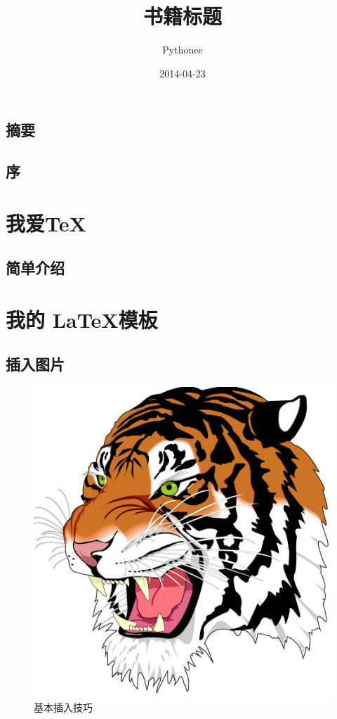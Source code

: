 \documentclass[fancyhdr,adobefonts,oneside,hyperref,openany,a4paper,UTF8]{ctexbook}
\author{Pythonee}
\title{书籍标题}
\date{2014-04-23}
\begin{document}
\maketitle


\frontmatter
\tableofcontents
\listoftables
\listoffigures
\lstlistoflistings
\setcounter{page}{0}
\chapter{摘要}
\lipsum[1]
\chapter{序}
\lipsum[1]


\mainmatter
\part{我爱\TeX}
\chapter{简单介绍}
\lipsum

\part{我的 \LaTeX 模板}
\chapter{插入图片}

\begin{figure}[htp]
  \centering
    \includegraphics[scale=0.25]{img/tiger}
    \caption{基本插入技巧}
    \label{fig:tiger}
\end{figure}
\end{document}
